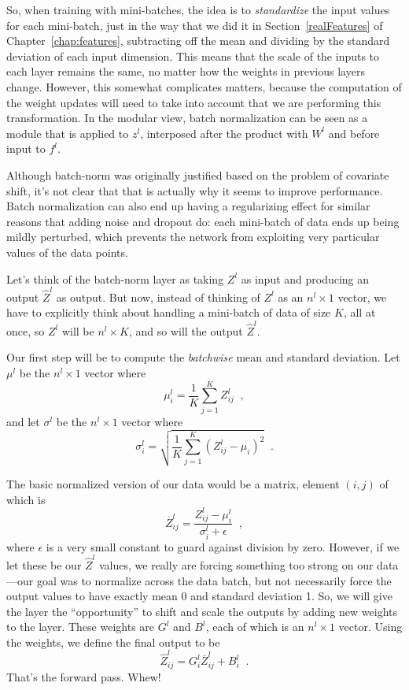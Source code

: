 So, when training with mini-batches, the idea is to {\em standardize}
the input values for each mini-batch, just in the way that we did it
in Section~\ref{realFeatures} of Chapter~\ref{chap:features}, subtracting off the mean
and dividing by the standard deviation of each input dimension.  This
means that the scale of the inputs to each layer remains the same, no
matter how the weights in previous layers change.  However, this
somewhat complicates matters, because the computation of the weight
updates will need to take into account that we are performing this
transformation.  In the modular view, batch normalization can be seen
as a module that is applied to $z^l$, interposed after the product
with $W^l$ and before input to $f^l$.

Although batch-norm was originally justified based on the problem of
covariate shift, it's not clear that that is actually why it seems to
improve performance.  
Batch normalization can also end up having a regularizing effect for similar
reasons that adding noise and dropout do:  each mini-batch of data
ends up being mildly perturbed, which prevents the network from
exploiting very particular values of the data points.

Let's think of the batch-norm layer as taking $Z^l$ as input and
producing an output $\widehat{Z}^l$ as output.  But now, instead of
thinking of $Z^l$ as an $n^l \times 1$ vector, we have to explicitly
think about handling a mini-batch of data of size $K$, all at once, so
$Z^l$ will be $n^l \times K$, and so will the output $\widehat{Z}^l$.  

Our first step will be to compute the {\em batchwise} mean and
standard deviation.  Let $\mu^l$ be the $n^l \times 1$ vector where
\[\mu^l_i = \frac{1}{K} \sum_{j = 1}^K Z^l_{ij}\;\;,\]
and let $\sigma^l$ be the $n^l \times 1$ vector where 
\[\sigma^l_i = \sqrt{\frac{1}{K} \sum_{j = 1}^K (Z^l_{ij} - \mu_i)^2}\;\;.\]

The basic normalized version of our data would be a matrix, 
element $(i, j)$ of which is 
\[\overline{Z}^l_{ij} = \frac{Z^l_{ij} - \mu^l_i}{\sigma^l_i + \epsilon}\;\;,\]
where $\epsilon$ is a very small constant to guard against division by
zero. 
However, if we let these be our $\widehat{Z}^l$ values, we really are
forcing something too strong on our data---our goal was to normalize
across the data batch, but not necessarily force the output values to
have exactly mean 0 and standard deviation 1.  So, we will give the
layer the ``opportunity'' to shift and scale the outputs by adding new
weights to the layer.  These weights are $G^l$ and $B^l$, each of
which is an $n^l \times 1$ vector.  Using the weights, we define the
final output to be 
\[\widehat{Z}^l_{ij} = G^l_i \overline{Z}^l_{ij} + B^l_i\;\;.\] 
That's the forward pass.  Whew!

